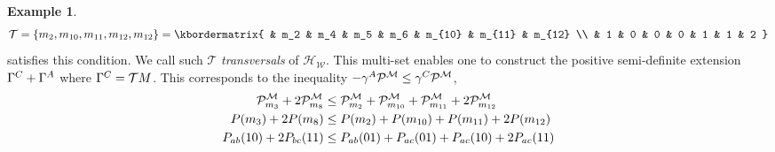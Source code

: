 \documentclass[aps, 10pt, english, twoside, pra, nofootinbib, longbibliography]{revtex4-1}
\theoremstyle{plain}
\theoremstyle{definition}
\newtheorem{definition}[theorem]{Definition}
\newtheorem{example}[theorem]{Example}
\theoremstyle{remark}
\newcommand{\hgraph}{\mathcal{H}}
\newcommand{\weights}{\mathcal{W}}
\newcommand{\trans}{\mathcal{T}}
\newcommand{\ext}{\mathrel{\Yleft}}
\newcommand{\res}{\mathrel{\Yright}}
\newcommand{\mscenario}{\mathcal{M}}
\newcommand{\jointvar}{\mathcal{J}}
\newcommand{\tcdot}{} %
\newcommand{\Events}[1]{\s{E}\br{#1}} %
\begin{document}
\begin{example}
        \[ \trans = \bc{m_{2}, m_{10}, m_{11}, m_{12}, m_{12}} = \kbordermatrix{
            & m_2 & m_4 & m_5 & m_6 & m_{10} & m_{11} & m_{12} \\
            &   1 &   0 &   0 &   0 &      1 &      1 &      2
        } \]
        satisfies this condition. We call such $\trans$ \textit{transversals} of $\hgraph_{\weights}$. This multi-set enables one to construct the positive semi-definite extension $\Gamma^{C} + \Gamma^{A}$ where $\Ga^{C} = \trans \tcdot M$. This corresponds to the inequality $- \ga^{A} \tcdot \probvec^{\mscenario} \leq \ga^{C} \tcdot \probvec^{\mscenario}$,
        \begin{align*}
        \probvec^{\mscenario}_{m_3} + 2 \probvec^{\mscenario}_{m_8} &\leq \probvec^{\mscenario}_{m_{2}} + \probvec^{\mscenario}_{m_{10}} + \probvec^{\mscenario}_{m_{11}} + 2 \probvec^{\mscenario}_{m_{12}} \\
        \prob[][m_3] + 2 \prob[][m_8] &\leq \prob[][m_{2}] + \prob[][m_{10}] + \prob[][m_{11}] + 2 \prob[][m_{12}] \\
        \prob[ab][10] + 2 \prob[bc][11] &\leq \prob[ab][01] + \prob[ac][01] + \prob[ac][10] + 2 \prob[ac][11]
        \end{align*}
    \end{example}
\end{document}

